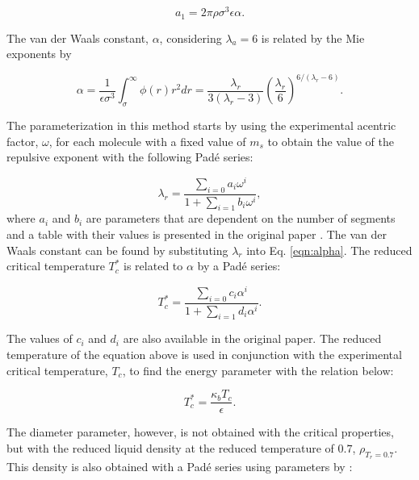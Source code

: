 	\begin{equation}
	a_{1} = 2\pi\rho\sigma^{3}\epsilon\alpha .
	\label{eqn:a1corres}
	\end{equation}
	
	The van der Waals constant, $\alpha$, considering $ \lambda_{a} = 6$ is related by the Mie exponents by
	
	\begin{equation}
	\alpha = \frac{1}{\epsilon\sigma^{3	}} \int_{\sigma}^{\infty} \phi(r)r^{2}dr = \frac{\lambda_{r}}{3(\lambda_{r}-3)}\left(\frac{\lambda_r}{6}\right)^{6/(\lambda_{r} - 6)}  .
	\label{eqn:alpha}
	\end{equation}
	
	The parameterization in this method starts by using the experimental acentric factor, $\omega$, for each molecule with a fixed value of $ m_{s}$ to obtain the value of the repulsive exponent with the following Padé series:
	
	\begin{equation}
	\lambda_{r} = \frac{\sum_{i=0} a_{i}\omega^{i}}{1+\sum_{i=1} b_{i}\omega^{i}} ,  
	\label{eqn:lambdaco}
	\end{equation}
	where $a_{i}$ and $b_{i}$ are parameters that are dependent on the number of segments and a table with their values is presented in the original paper \cite{mejia2014}. The van der Waals constant can be found by substituting $\lambda_{r}$ into Eq. \eqref{eqn:alpha}. The reduced critical temperature $T_{c}^{*}$ is related to $\alpha$ by a Padé series: 
	
	\begin{equation}
	T_{c}^{*} = \frac{\sum_{i=0} c_{i}\alpha^{i}}{1+\sum_{i=1} d_{i}\alpha^{i}}   .
	\label{eqn:tc}
	\end{equation}
	
	The values of $c_{i}$ and $d_{i}$ are also available in the original paper. The reduced temperature of the equation above is used in conjunction with the experimental critical temperature, $ T_{c}$, to find the energy parameter with the relation below:
	
	\begin{equation}
	T_{c}^{*} = \frac{\kappa_{b}T_{c}}{\epsilon}   .
	\label{eqn:epscorre}
	\end{equation}
	
	The diameter parameter, however, is not obtained with the critical properties, but with the reduced liquid density at the reduced temperature of $0.7$, $\rho_{T_{r}=0.7}$. This density is also obtained with a Padé series using parameters by :
	
